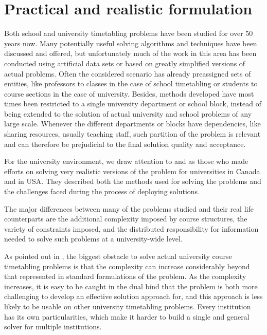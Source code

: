 \section{Practical and realistic formulation}

Both school and university timetabling problems have been studied for over 50 years now. Many potentially useful solving algorithms and techniques have been discussed and offered, but unfortunately much of the work in this area has been conducted using artificial data sets or based on greatly simplified versions of actual problems. Often the considered scenario has already preassigned sets of entities, like professors to classes in the case of school timetabling or students to course sections in the case of university. Besides, methods developed have most times been restricted to a single university department or school block, instead of being extended to the solution of actual university and school problems of any large scale. Whenever the different departments or blocks have dependencies, like sharing resources, usually teaching staff, such partition of the problem is relevant and can therefore be prejudicial to the final solution quality and acceptance.

For the university environment, we draw attention to \cite{Carter2001} and \cite{Murray2007} as those who made efforts on solving very realistic versions of the problem for universities in Canada and in USA. They described both the methods used for solving the problems and the challenges faced during the process of deploying solutions.

The major differences between many of the problems studied and their real life counterparts are the additional complexity imposed by course structures, the variety of constraints imposed, and the distributed responsibility for information needed to solve such problems at a university-wide level.

As pointed out in \cite{Murray2007}, the biggest obstacle to solve actual university course timetabling problems is that the complexity can increase considerably beyond that represented in standard formulations of the problem. As the complexity increases, it is easy to be caught in the dual bind that the problem is both more challenging to develop an effective solution approach for, and this approach is less likely to be usable on other university timetabling problems. Every institution has its own particularities, which make it harder to build a single and general solver for multiple institutions.

